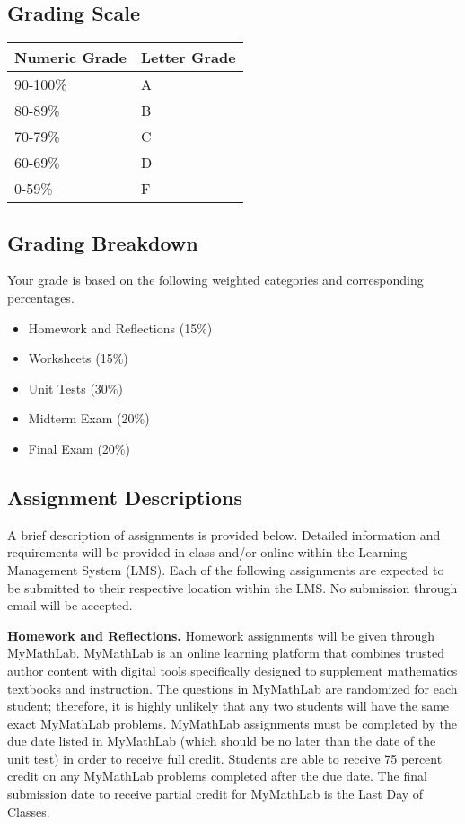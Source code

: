 \documentclass{article}
\begin{document}
\subsection{Grading Scale}

\bigskip\noindent
\begin{tabular}{p{}p{}}
\toprule
Numeric Grade & Letter Grade \\
\hline
90-100\% & A \\
80-89\% & B \\
70-79\% & C \\
60-69\% & D \\
0-59\% & F \\
\bottomrule
\end{tabular}

\bigskip\subsection{Grading Breakdown}

Your grade is based on the following weighted categories and corresponding percentages.

\begin{itemize}
\item Homework and Reflections (15\%)
\item Worksheets (15\%)
\item Unit Tests (30\%)
\item Midterm Exam (20\%)
\item Final Exam (20\%)
\end{itemize}

\subsection{Assignment Descriptions}

A brief description of assignments is provided below. Detailed information and requirements will be provided in class and/or online within the Learning Management System (LMS). Each of the following assignments are expected to be submitted to their respective location within the LMS. No submission through email will be accepted.

\textbf{Homework and Reflections.} Homework assignments will be given through MyMathLab. MyMathLab is an online learning platform that combines trusted author content with digital tools specifically designed to supplement mathematics textbooks and instruction. The questions in MyMathLab are randomized for each student; therefore, it is highly unlikely that any two students will have the same exact MyMathLab problems. MyMathLab assignments must be completed by the due date listed in MyMathLab (which should be no later than the date of the unit test) in order to receive full credit. Students are able to receive 75 percent credit on any MyMathLab problems completed after the due date. The final submission date to receive partial credit for MyMathLab is the Last Day of Classes.
\end{document}
